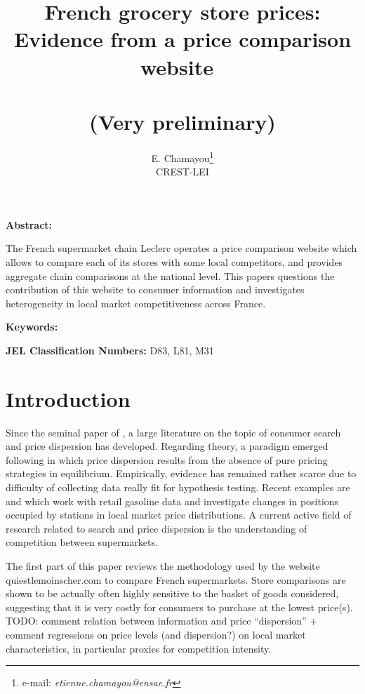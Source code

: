 \documentclass[11pt]{article}
\begin{document}
\title{French grocery store prices: Evidence from a price comparison website\ \\ \ \\(Very preliminary)}
\author{E. Chamayou\thanks{e-mail:
\textit{etienne.chamayou@ensae.fr}} \\ CREST-LEI}
\maketitle

\sloppy%

\onehalfspacing

\textbf{Abstract:}

The French supermarket chain Leclerc operates a price comparison website which allows to compare each of its stores with some local competitors, and provides aggregate chain comparisons at the national level. This papers questions the contribution of this website to consumer information and investigates heterogeneity in local market competitiveness across France.

\strut

\textbf{Keywords:}

\strut

\textbf{JEL Classification Numbers:} D83, L81, M31

\pagebreak%
\doublespacing

\section{Introduction}

Since the seminal paper of \cite{STI61}, a large literature on the topic of consumer search and price dispersion has developed. Regarding theory, a paradigm emerged following \cite{VAR80} in which price dispersion results from the absence of pure pricing strategies in equilibrium. Empirically, evidence has remained rather scarce due to difficulty of collecting data really fit for hypothesis testing. Recent examples are \cite{TAP11} and \cite{CHA15} which work with retail gasoline data and investigate changes in positions occupied by stations in local market price distributions. A current active field of research related to search and price dispersion is the understanding of competition between supermarkets.

The first part of this paper reviews the methodology used by the website quiestlemoinscher.com to compare French supermarkets. Store comparisons are shown to be actually often highly sensitive to the basket of goods considered, suggesting that it is very costly for consumers to purchase at the lowest price(s). TODO: comment relation between information and price "`dispersion"' + comment regressions on price levels (and dispersion?) on local market characteristics, in particular proxies for competition intensity.
\end{document}
